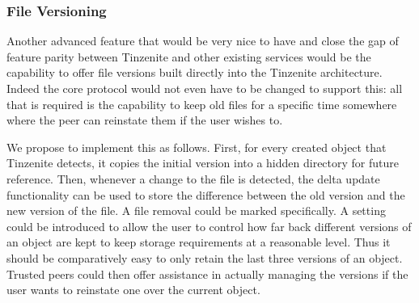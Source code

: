 \subsubsection{File Versioning}
\label{subs:File Versioning}

Another advanced feature that would be very nice to have and close the gap of feature parity between Tinzenite and other existing services would be the capability to offer file versions built directly into the Tinzenite architecture.
Indeed the core protocol would not even have to be changed to support this: all that is required is the capability to keep old files for a specific time somewhere where the peer can reinstate them if the user wishes to.

We propose to implement this as follows.
First, for every created object that Tinzenite detects, it copies the initial version into a hidden directory for future reference.
Then, whenever a change to the file is detected, the delta update functionality can be used to store the difference between the old version and the new version of the file.
A file removal could be marked specifically.
A setting could be introduced to allow the user to control how far back different versions of an object are kept to keep storage requirements at a reasonable level.
Thus it should be comparatively easy to only retain the last three versions of an object.
Trusted peers could then offer assistance in actually managing the versions if the user wants to reinstate one over the current object.
